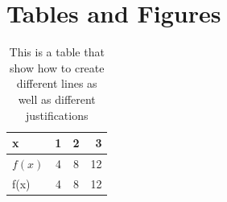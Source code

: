 \documentclass[15pt, a4paper]{article}
\begin{document}
    
    \section{Tables and Figures}
    
    \begin{table}[hbt!]
        \centering
        \begin{tabular}{|l||c|c|r|}
            \hline 
            x & 1 & 2 & 3 \\
            \hline 
            $f(x)$ & 4 & 8 & 12 \\
            \hline
            f(x) & 4 & 8 & 12 \\
            \hline
        \end{tabular}
        \caption{This is a table that show how to create different lines as well as different justifications}
        \label{tab:my_label}
    \end{table}
    
\end{document}
